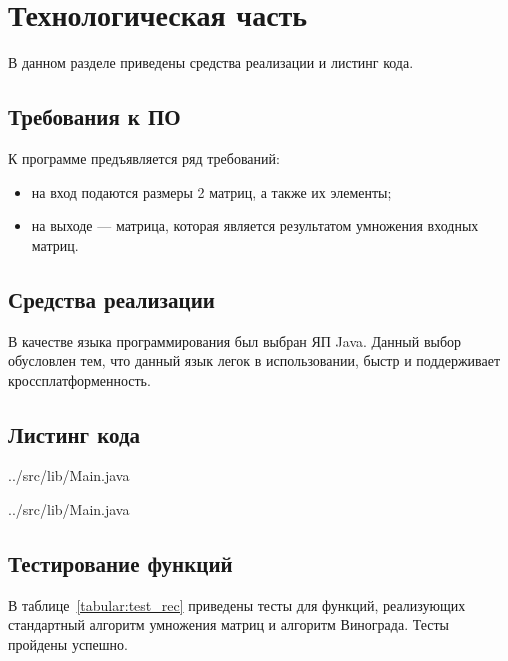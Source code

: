 \chapter{Технологическая часть}

В данном разделе приведены средства реализации и листинг кода.

\section{Требования к ПО}

К программе предъявляется ряд требований:
\begin{itemize}
	\item на вход подаются размеры 2 матриц, а также их элементы;
	\item на выходе — матрица, которая является результатом умножения входных матриц.
\end{itemize}

\section{Средства реализации}

В качестве языка программирования был выбран ЯП Java. Данный выбор обусловлен тем, что данный язык легок в использовании, быстр и поддерживает кроссплатформенность.

\section{Листинг кода}

\begin{lstinputlisting}[
	caption={Стандартный алгоритм умножения матриц},
	label={lst:simple},
	style={javalang},
	linerange={5-24}
]{../src/lib/Main.java}
\end{lstinputlisting}

\begin{lstinputlisting}[
	caption={Алгоритм Копперсмита — Винограда},
	label={lst:vino},
	style={javalang},
	linerange={26-69}
]{../src/lib/Main.java}
\end{lstinputlisting}

\section{Тестирование функций}

В таблице~\ref{tabular:test_rec} приведены тесты для функций, реализующих стандартный алгоритм умножения матриц и алгоритм Винограда. Тесты пройдены успешно.

